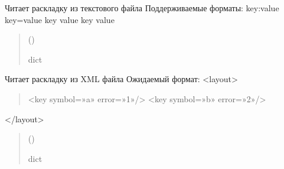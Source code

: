 \documentclass[a4paper,11pt,russian,openany,oneside]{sphinxmanual}
\begin{document}

\begin{savenotes}\begin{fulllineitems}
\label{\detokenize{_autosummary/scan_module.read_layout:scan_module.read_layout._read_text_layout}}
\pysigstartsignatures
\pysiglinewithargsret
{}
{}
{}
\pysigstopsignatures
\sphinxAtStartPar
Читает раскладку из текстового файла
Поддерживаемые форматы:
\sphinxhyphen{} key:value
\sphinxhyphen{} key=value
\sphinxhyphen{} key value
\sphinxhyphen{} key       value
\begin{quote}\begin{description}
\sphinxAtStartPar
{} ()

\sphinxAtStartPar
dict

\end{description}\end{quote}

\end{fulllineitems}\end{savenotes}


\begin{savenotes}\begin{fulllineitems}
\label{\detokenize{_autosummary/scan_module.read_layout:scan_module.read_layout._read_xml_layout}}
\pysigstartsignatures
\pysiglinewithargsret
{}
{}
{}
\pysigstopsignatures
\sphinxAtStartPar
Читает раскладку из XML файла
Ожидаемый формат:
<layout>
\begin{quote}

\sphinxAtStartPar
<key symbol=»a» error=»1»/>
<key symbol=»b» error=»2»/>
\end{quote}

\sphinxAtStartPar
</layout>
\begin{quote}\begin{description}
\sphinxAtStartPar
{} ()

\sphinxAtStartPar
dict

\end{description}\end{quote}

\end{fulllineitems}\end{savenotes}
\end{document}
